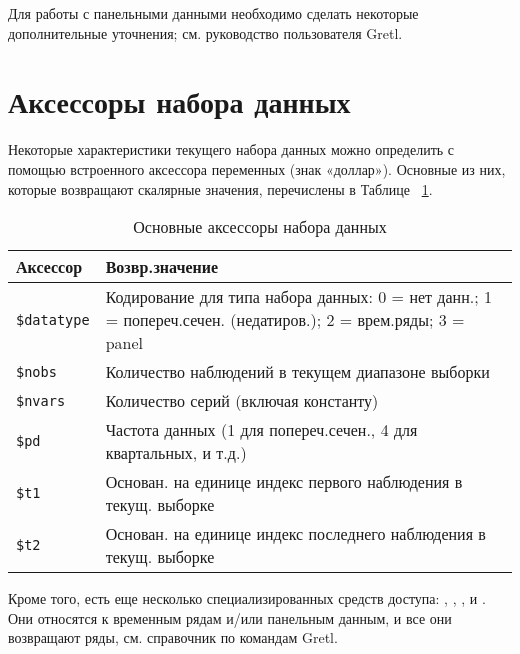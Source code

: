 Для работы с панельными данными необходимо сделать некоторые
дополнительные уточнения; см. руководство пользователя Gretl.

\section{Аксессоры набора данных}
\label{sec:accessors}

Некоторые характеристики текущего набора данных можно определить с
помощью встроенного аксессора переменных (знак «доллар»). Основные из
них, которые возвращают скалярные значения, перечислены в Таблице
~\ref{tab:dataset-accessors}.

\begin{table}[htbp]
  \centering
  \begin{tabular}{lp{}}
    \textbf{Аксессор} & \textbf{Возвр.значение} \\ \hline
    \verb|$datatype| & Кодирование для типа набора данных: 
    0 = нет данн.; 1 = попереч.сечен. (недатиров.); 2 = врем.ряды;
    3 = panel \\
    \verb|$nobs| & Количество наблюдений в текущем
    диапазоне выборки \\
    \verb|$nvars| & Количество серий (включая константу)\\
    \verb|$pd| & Частота данных (1 для попереч.сечен., 4 для квартальных, и т.д.) \\
    \verb|$t1| & Основан. на единице индекс первого наблюдения в текущ. выборке \\
    \verb|$t2| & Основан. на единице индекс последнего наблюдения в текущ. выборке \\
    \hline
  \end{tabular}
  \caption{Основные аксессоры набора данных}
  \label{tab:dataset-accessors}
\end{table}
Кроме того, есть еще несколько специализированных средств доступа:
, , ,
 и . Они относятся к временным рядам
и/или панельным данным, и все они возвращают ряды, см. справочник по
командам Gretl.

